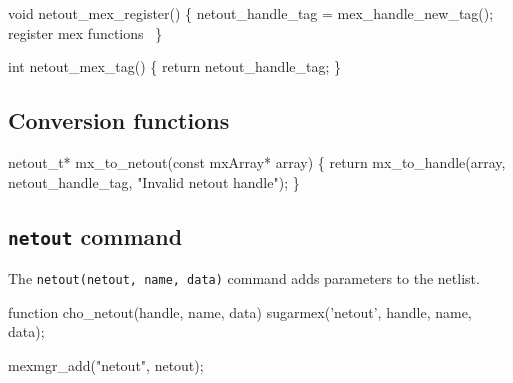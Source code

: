\nwenddocs{}\endmoddef
void netout_mex_register()
\{
    netout_handle_tag = mex_handle_new_tag();
    \LA{}register mex functions~{\nwtagstyle{}}\RA{}
\}

\nwendcode{}\nwdocspar

\nwenddocs{}\plusendmoddef
int netout_mex_tag()
\{
    return netout_handle_tag;
\}

\nwendcode{}\nwdocspar

\subsection{Conversion functions}

\nwenddocs{}\plusendmoddef
netout_t* mx_to_netout(const mxArray* array)
\{
    return mx_to_handle(array, netout_handle_tag, "Invalid netout handle");
\}

\nwendcode{}\nwdocspar


\subsection{{\tt{}netout} command}

The {\tt{}netout(netout,\ name,\ data)} command adds parameters to the netlist.

\nwenddocs{}\endmoddef
function cho_netout(handle, name, data)
sugarmex('netout', handle, name, data);
\nwendcode{}\nwdocspar

\nwenddocs{}\endmoddef
mexmgr_add("netout", netout);
\nwendcode{}\nwdocspar

